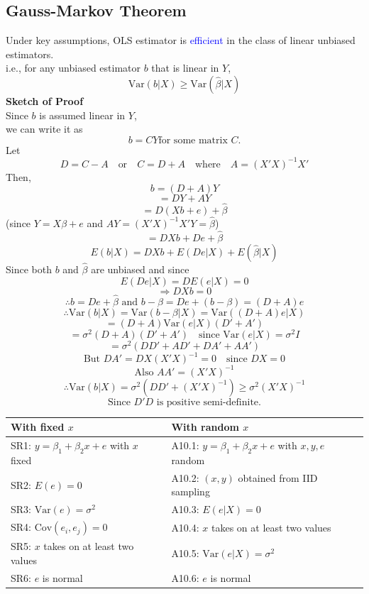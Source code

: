 \documentclass[14pt]{extarticle}
\begin{document}
\subsection*{Gauss-Markov Theorem}

\noindent
Under key assumptions, OLS estimator is \textcolor{blue}{efficient} in the class of linear unbiased estimators. \\
i.e., for any unbiased estimator $b$ that is linear in $Y$, 
\[
\text{Var}(b | X) \geq \text{Var}(\hat{\beta} | X)
\]
\textbf{Sketch of Proof}\\
Since \( b \) is assumed linear in \( Y \), \\
we can write it as
\[b = C Y  \text{for some matrix } C.
\]
Let 
\[
 D = C - A  \quad \text{or} \quad C = D + A \quad \text{where} \quad A = (X' X)^{-1} X'
\]
Then,
\[
b = (D + A)Y
\]
\[
= DY + AY
\]
\[
= D(Xb + e) + \hat{\beta}
\]
(since \( Y = X\beta + e \) and \( AY = (X'X)^{-1}X'Y = \hat{\beta} \))
\[
= DXb + De + \hat{\beta}
\]
\[
E(b | X) = DXb + E(De | X) + E(\hat{\beta} | X)
\]
Since both \(b\) and \(\hat{\beta}\) are unbiased and since
\[
E(De | X) = D E(e | X) = 0
\]
\[
\Rightarrow DXb = 0
\]
\[
\therefore b = De + \hat{\beta} \text{ and } b - \beta = De + (b - \beta) = (D + A) e
\]
\[
\therefore \text{Var}(b | X) = \text{Var}(b - \beta | X) = \text{Var}((D + A)e | X)
\]
\[
= (D + A) \text{Var}(e | X) (D' + A')
\]
\[
= \sigma^2 (D + A)(D' + A') \quad \text{since Var}(e | X) = \sigma^2 I
\]
\[
= \sigma^2 (DD' + AD' + DA' + AA')
\]
\[
\text{But } DA' = D X (X'X)^{-1} = 0 \quad \text{since } DX = 0
\]
\[
\text{Also } AA' = (X'X)^{-1}
\]
\[
\therefore \text{Var}(b | X) = \sigma^2 (DD' + (X'X)^{-1}) \geq \sigma^2 (X'X)^{-1}
\]
\[
\text{Since } D'D \text{ is positive semi-definite.}
\]
\begin{table}[H]
\centering
\begin{tabular}{|l|l|}
\hline
\textbf{With fixed }$x$ & \textbf{With random }$x$ \\ \hline
SR1: $y = \beta_1 + \beta_2 x + e$ with $x$ fixed & A10.1: $y = \beta_1 + \beta_2 x + e$ with $x, y, e$ random \\ \hline
SR2: $E(e) = 0$ & A10.2: $(x, y)$ obtained from IID sampling \\ \hline
SR3: $\text{Var}(e) = \sigma^2$ & A10.3: $E(e | X) = 0$ \\ \hline
SR4: $\text{Cov}(e_i, e_j) = 0$ & A10.4: $x$ takes on at least two values \\ \hline
SR5: $x$ takes on at least two values & A10.5: $\text{Var}(e | X) = \sigma^2$ \\ \hline
SR6: $e$ is normal & A10.6: $e$ is normal \\ \hline
\end{tabular}
\end{table}
    
\end{document}
